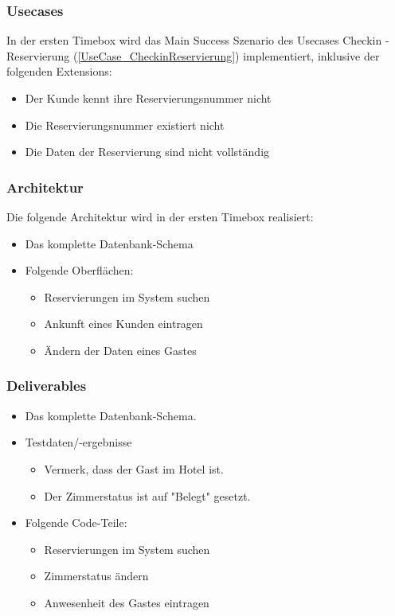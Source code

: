 \subsubsection{Usecases}
In der ersten Timebox wird das Main Success Szenario des Usecases Checkin - Reservierung (\ref{UseCase_CheckinReservierung}) implementiert,
inklusive der folgenden Extensions:

\begin{itemize}
	\item Der \Gls{Kunde} kennt ihre \Gls{Reservierungsnummer} nicht
	\item Die \Gls{Reservierungsnummer} existiert nicht
	\item Die Daten der \Gls{Reservierung} sind nicht vollständig
\end{itemize}
\subsubsection{Architektur}
Die folgende Architektur wird in der ersten Timebox realisiert:

\begin{itemize}
	\item Das komplette Datenbank-Schema
	\item Folgende Oberflächen:
	\begin{itemize}
		\item \Gls{Reservierung}en im System suchen
		\item Ankunft eines \Gls{Kunde}n eintragen
		\item Ändern der Daten eines \Gls{Gast}es
	\end{itemize}
\end{itemize}
\subsubsection{Deliverables}
\begin{itemize}
	\item Das komplette Datenbank-Schema.
	\item Testdaten/-ergebnisse
	\begin{itemize}
		\item Vermerk, dass der \Gls{Gast} im Hotel ist.
		\item Der Zimmerstatus ist auf "Belegt" gesetzt.
	\end{itemize}

	\item Folgende Code-Teile:
	\begin{itemize}
		\item \Gls{Reservierung}en im System suchen
		\item Zimmerstatus ändern
		\item Anwesenheit des \Gls{Gast}es eintragen
	\end{itemize}
\end{itemize}

